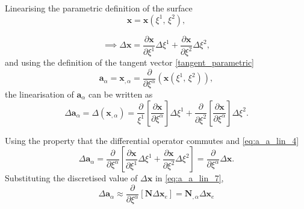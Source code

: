 Linearising the parametric definition of the surface 
    \begin{equation}\label{eq:a_a_lin_3}
        \boldsymbol{x} = \boldsymbol{x} \left( \xi^{1}, \, \xi^{2} \right),
    \end{equation}
    
    \begin{equation}\label{eq:a_a_lin_4}
       \implies \Delta \boldsymbol{x} = \frac{\partial \boldsymbol{x}}{\partial \xi^{1}} \Delta \xi^{1} + \frac{\partial \boldsymbol{x}}{\partial \xi^{2}} \Delta \xi^{2},
    \end{equation}
and using the definition of the tangent vector \eqref{tangent_parametric} 
\begin{equation}\label{eq:a_a_lin_2}
    \boldsymbol{a}_{\alpha} = \boldsymbol{x}_{, \alpha} = \frac{\partial}{\partial \xi^{\alpha}} \left( \boldsymbol{x} \left( \xi^{1}, \, \xi^{2} \right) \right), 
\end{equation}
the linearisation of $\boldsymbol{a}_{\alpha}$ can be written as 
    \begin{equation}\label{eq:a_a_lin_6}
        \Delta \boldsymbol{a}_{\alpha} = \Delta \left( \boldsymbol{x}_{, \alpha}\right) = \frac{\partial}{\xi^{1}} \left[ \frac{\partial \boldsymbol{x}}{\partial \xi^{\alpha}} \right] \Delta \xi^{1} + \frac{\partial}{\partial \xi^{2}} \left[ \frac{\partial \boldsymbol{x}}{\partial \xi^{\alpha}} \right] \Delta \xi^{2}.
    \end{equation}
    
Using the property that the differential operator commutes and \eqref{eq:a_a_lin_4}     
    \begin{equation}\label{eq:a_a_lin_7}
        \Delta \boldsymbol{a}_{\alpha} = \frac{\partial}{\partial \xi^{\alpha}} \left[ \frac{\partial \boldsymbol{x}}{\partial \xi^{1}} \Delta \xi^{1} + \frac{\partial \boldsymbol{x}}{\partial \xi^{2}} \Delta \xi^{2} \right] = \frac{\partial}{\partial \xi^{\alpha}} \Delta \boldsymbol{x}.
    \end{equation}
Substituting the discretised value of $\Delta \boldsymbol{x}$ in \eqref{eq:a_a_lin_7},    
    \begin{equation}\label{eq:a_a_lin_8}
        \Delta \boldsymbol{a}_{\alpha} \approx \frac{\partial}{\partial \xi^{\alpha}} \left[ \mathbf{N} \Delta \mathbf{x}_{e} \right] = \mathbf{N}_{, \alpha} \Delta \mathbf{x}_{e}
    \end{equation}
